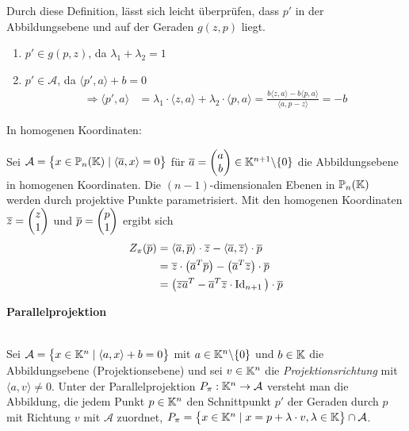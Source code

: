   \begin{bem}
  Durch diese Definition, lässt sich leicht überprüfen, dass $p'$ in der Abbildungsebene und auf der Geraden $g(z,p)$ liegt.
    \begin{enumerate}
      \item $p'\in g(p,z)$, da $\lambda_1 + \lambda_2 = 1$
      \item $p'\in \mathcal{A}$, da $\langle p',a \rangle +b = 0$
            \begin{align*}
              \Rightarrow \langle p',a \rangle & = \lambda_1 \cdot \langle z,a \rangle + \lambda_2 \cdot \langle p,a \rangle
                                                 = \frac{b\langle z,a \rangle - b\langle p,a \rangle}{\langle a,p-z \rangle}
                                                 = -b
            \end{align*}
    \end{enumerate}
  \end{bem}

  In homogenen Koordinaten: \par

  Sei $\mathcal{A} = \big\{ x \in \mathbb{P}_n(\mathbb K) \mid \langle \overline{a},x \rangle = 0 \big\}$ für $\overline{a}=\begin{pmatrix}{a}\\{b}\end{pmatrix} \in \mathbb K^{n+1}\backslash\{0\}$ die
  Abbildungsebene in homogenen Koordinaten. Die $(n-1)$-dimensionalen Ebenen in $\mathbb{P}_n(\mathbb K)$ werden durch projektive Punkte parametrisiert. Mit den homogenen
  Koordinaten $\overline{z}=\begin{pmatrix}{z}\\{1}\end{pmatrix}$ und $\overline{p}=\begin{pmatrix}{p}\\{1}\end{pmatrix}$ ergibt sich
  \begin{align*}
    Z_\pi(\overline{p}) & = \langle \overline{a},\overline{p} \rangle \cdot \overline{z} - \langle \overline{a},\overline{z} \rangle \cdot \overline{p} \\
                        & = \overline{z} \cdot \big( \overline{a}^T \overline{p} \big) - \big( \overline{a}^T \overline{z} \big) \cdot \overline{p} \\
                        & = \big( \overline{z}\overline{a}^T - \overline{a}^T\overline{z} \cdot \operatorname{Id}_{n+1} \big) \cdot \overline{p}
  \end{align*}


  \textbf{Parallelprojektion}

  \begin{defi} \ \\
    Sei $\mathcal{A}=\big\{ x \in \mathbb K^n \mid \langle a,x \rangle + b = 0 \big\}$ mit $a \in \mathbb K^n \backslash\{0\}$ und $b\in \mathbb K$ die
    Abbildungsebene (Projektionsebene) und    sei $v\in \mathbb K^n$ die \textit{Projektionsrichtung} mit $\langle a,v \rangle \neq 0$.
    Unter der Parallelprojektion $P_\pi: \mathbb K^n \rightarrow \mathcal{A}$ versteht man die Abbildung, die jedem Punkt $p\in \mathbb K^n$ den
    Schnittpunkt $p'$ der Geraden durch $p$ mit Richtung $v$ mit $\mathcal{A}$ zuordnet,
    $P_\pi = \big\{ x\in\mathbb K^n \mid x=p+\lambda \cdot v, \lambda \in \mathbb K \big\} \cap \mathcal{A}$.
  \end{defi}


